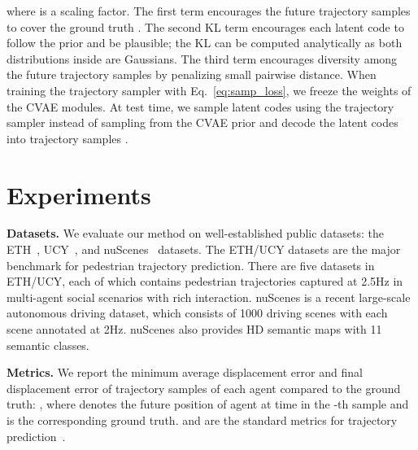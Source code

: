 \documentclass[10pt,twocolumn,letterpaper]{article}
\begin{document}
\vspace{-3mm}
\begin{small}

\vspace{-2mm}
\end{small}

\noindent where  is a scaling factor. The first term encourages the future trajectory samples  to cover the ground truth . The second KL term encourages each latent code  to follow the prior and be plausible; the KL can be computed analytically as both distributions inside are Gaussians. The third term encourages diversity among the future trajectory samples  by penalizing small pairwise distance. When training the trajectory sampler with Eq.~\eqref{eq:samp_loss}, we freeze the weights of the CVAE modules. At test time, we sample latent codes  using the trajectory sampler instead of sampling from the CVAE prior and decode the latent codes into trajectory samples .

\section{Experiments}
\label{sec:exp}

\noindent\textbf{Datasets.}
We evaluate our method on well-established public datasets: the ETH~\cite{pellegrini2009you}, UCY~\cite{lerner2007crowds}, and nuScenes~\cite{caesar2020nuscenes} datasets. The ETH/UCY datasets are the major benchmark for pedestrian trajectory prediction. There are five datasets in ETH/UCY, each of which contains pedestrian trajectories captured at 2.5Hz in multi-agent social scenarios with rich interaction. nuScenes is a recent large-scale autonomous driving dataset, which consists of 1000 driving scenes with each scene annotated at 2Hz. nuScenes also provides HD semantic maps with 11 semantic classes.

\vspace{2mm}
\noindent\textbf{Metrics.}
We report the minimum average displacement error  and final displacement error  of  trajectory samples of each agent compared to the ground truth: , where   denotes the future position of agent  at time  in the -th sample and  is the corresponding ground truth.  and  are the standard metrics for trajectory prediction~\cite{gupta2018social,sadeghian2019sophie,salzmann2020trajectron++,phan2020covernet,chai2020multipath}.
\end{document}
